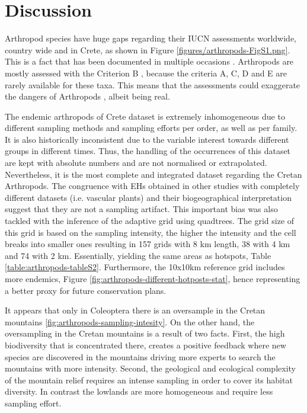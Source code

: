 \section{Discussion}
\label{sec:arthropods-discussion}

Arthropod species have huge gaps regarding their IUCN assessments worldwide,
country wide and in Crete, as shown in Figure \ref{figures/arthropods-FigS1.png}. 
This is a fact that has been documented in multiple occasions \parencite{cardoso2012the-underrepresentation, chowdhury2023protected}. 
Arthropods are mostly assessed with the Criterion B \parencite{cardoso2011adapting,carpaneto2015a-red-list},
because the criteria A, C, D and E are rarely available for these taxa.
This means that the assessments could exaggerate the dangers of Arthropods \parencite{cardoso2011adapting},
albeit being real. 

The endemic arthropods of Crete dataset is extremely inhomogeneous due to
different sampling methods and sampling efforts per order, as well as per family.
It is also historically inconsistent due to the variable interest towards
different groups in different times.
Thus, the handling of the occurrences of this dataset are kept with absolute numbers 
and are not normalised or extrapolated. 
Nevertheless, it is the most complete and integrated dataset regarding the Cretan Arthropods.
The congruence with EHs obtained in other studies with completely different
datasets (i.e. vascular plants) \parencite{kougioumoutzis2020plant} and their biogeographical interpretation suggest
that they are not a sampling artifact. 
This important bias was also tackled with the inference of the adaptive grid using quadtrees.
The grid size of this grid is based on the sampling intensity, the higher the
intensity and the cell breaks into smaller ones resulting in 157 grids with
8 km length, 38 with 4 km and 74 with 2 km. Essentially, yielding the same areas 
as hotspots, Table \ref{table:arthropods-tableS2}. Furthermore, the 10x10km reference 
grid includes more endemics, Figure \ref{fig:arthropods-different-hotposts-stat},
hence representing a better proxy for future conservation plans.

It appears that only in Coleoptera there is an oversample in the Cretan mountains \ref{fig:arthropods-sampling-intesity}.
On the other hand, the oversampling in the Cretan mountains is a result of two facts.
First, the high biodiversity that is concentrated there, creates a positive
feedback where new species are discovered in the mountains driving more experts
to search the mountains with more intensity.
Second, the geological and ecological
complexity of the mountain relief requires an intense sampling in order to
cover its habitat diversity. In contrast the lowlands are more homogeneous and require less sampling effort.

